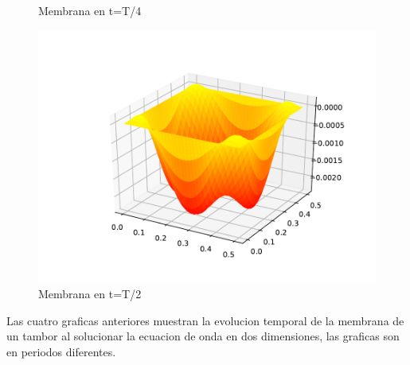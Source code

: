 \documentclass[letter]{article}
\begin{document}
\begin{figure}[h]
\begin{minipage}[b]{0.7\linewidth}
    \caption{Membrana en t=T/4} 
    \vspace{4ex}
  \end{minipage}%
  \begin{minipage}[b]{0.7\linewidth}
    \centering
    \includegraphics[width=.8\linewidth]{Tambor4.pdf} 
    \caption{Membrana en t=T/2} 
    \vspace{4ex}
  \end{minipage} 
\end{figure}

Las cuatro graficas anteriores muestran la evolucion temporal de la membrana de un tambor al solucionar la ecuacion de onda en dos dimensiones, las graficas son en periodos diferentes.
\end{document}
